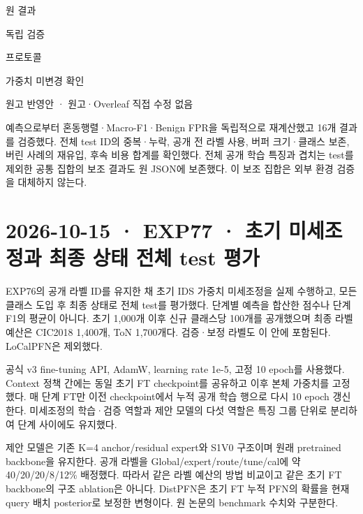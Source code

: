 \par\noindent \textbullet\enspace 원 결과


\par\noindent \textbullet\enspace 독립 검증


\par\noindent \textbullet\enspace 프로토콜


\par\noindent \textbullet\enspace 가중치 미변경 확인


\par\noindent \textbullet\enspace 원고 반영안 · 원고·Overleaf 직접 수정 없음


예측으로부터 혼동행렬·Macro-F1·Benign FPR을 독립적으로 재계산했고 16개 결과를 검증했다. 전체 test ID의 중복·누락, 공개 전 라벨 사용, 버퍼 크기·클래스 보존, 버린 사례의 재유입, 후속 비용 합계를 확인했다. 전체 공개 학습 특징과 겹치는 test를 제외한 공통 집합의 보조 결과도 원 JSON에 보존했다. 이 보조 집합은 외부 환경 검증을 대체하지 않는다.



\section{2026-10-15 · EXP77 · 초기 미세조정과 최종 상태 전체 test 평가}
\label{report:20261015_exp77_results}
EXP76의 공개 라벨 ID를 유지한 채 초기 IDS 가중치 미세조정을 실제 수행하고, 모든 클래스 도입 후 최종 상태로 전체 test를 평가했다. 단계별 예측을 합산한 점수나 단계 F1의 평균이 아니다. 초기 1,000개 이후 신규 클래스당 100개를 공개했으며 최종 라벨 예산은 CIC2018 1,400개, ToN 1,700개다. 검증·보정 라벨도 이 안에 포함된다. LoCalPFN은 제외했다.

공식 v3 fine-tuning API, AdamW, learning rate 1e-5, 고정 10 epoch를 사용했다. Context 정책 간에는 동일 초기 FT checkpoint를 공유하고 이후 본체 가중치를 고정했다. 매 단계 FT만 이전 checkpoint에서 누적 공개 학습 행으로 다시 10 epoch 갱신한다. 미세조정의 학습·검증 역할과 제안 모델의 다섯 역할은 특징 그룹 단위로 분리하여 단계 사이에도 유지했다.

제안 모델은 기존 K=\allowbreak{}4 anchor/\allowbreak{}residual expert와 S1V0 구조이며 원래 pretrained backbone을 유지한다. 공개 라벨을 Global/\allowbreak{}expert/\allowbreak{}route/\allowbreak{}tune/\allowbreak{}cal에 약 40/\allowbreak{}20/\allowbreak{}20/\allowbreak{}8/\allowbreak{}12\% 배정했다. 따라서 같은 라벨 예산의 방법 비교이고 같은 초기 FT backbone의 구조 ablation은 아니다. DistPFN은 초기 FT 누적 PFN의 확률을 현재 query 배치 posterior로 보정한 변형이다. 원 논문의 benchmark 수치와 구분한다.


